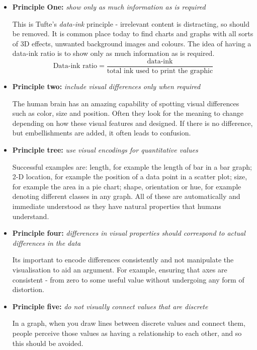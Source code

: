 \documentclass[a4paper,11pt,titlepage]{article}
\begin{document}
		\par
	\begin{itemize}
		\item \textbf{Principle One:}
		\textit{show only as much information as is required}
		\par 
		This is Tufte's \textit{data-ink} principle - irrelevant content is distracting, so should be removed. It is common place today to find charts and graphs with all sorts of 3D effects, unwanted background images and colours. The idea of having a data-ink ratio is to show only as much information as is required.
		$$
		\text{Data-ink ratio} = 
		\frac{\text{data-ink}}{\text{total ink used to print the graphic}}
		$$

		\item \textbf{Principle two:}
		\textit{include visual differences only when required} 
		\par
		The human brain has an amazing capability of spotting visual differences such as color, size and position. Often they look for the meaning to change depending on how these visual features and designed. If there is no difference, but embellishments are added, it often leads to confusion.

		\item \textbf{Principle tree:}
		\textit{use visual encodings for quantitative values}
		\par 
		Successful examples are: length, for example the length of bar in a bar graph; 2-D location, for example the position of a data point in a scatter plot; size, for example the area in a pie chart; shape, orientation or hue, for example denoting different classes in any graph. All of these are automatically and immediate understood as they have natural properties that humans understand. 

		\item \textbf{Principle four:}
		\textit{differences in visual properties should correspond to actual differences in the data}
		\par 
		Its important to encode differences consistently and not manipulate the visualisation to aid an argument. For example, ensuring that axes are consistent - from zero to some useful value without undergoing any form of distortion.

		\item \textbf{Principle five:}
		\textit{do not visually connect values that are discrete}
		\par 
		In a graph, when you draw lines between discrete values and connect them, people perceive those values as having a relationship to each other, and so this should be avoided.


\end{itemize}
\end{document}
